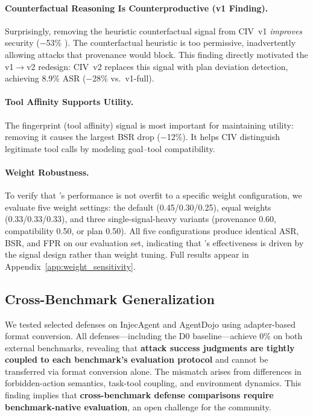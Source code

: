 \paragraph{Counterfactual Reasoning Is Counterproductive (v1 Finding).}
Surprisingly, removing the heuristic counterfactual signal from CIV~v1 \emph{improves} security ($-$53\% \asr{}).
The counterfactual heuristic is too permissive, inadvertently allowing attacks that provenance would block.
This finding directly motivated the v1$\to$v2 redesign: CIV~v2 replaces this signal with plan deviation detection, achieving 8.9\% ASR ($-$28\% vs.\ v1-full).

\paragraph{Tool Affinity Supports Utility.}
The fingerprint (tool affinity) signal is most important for maintaining utility: removing it causes the largest BSR drop ($-$12\%).
It helps CIV distinguish legitimate tool calls by modeling goal--tool compatibility.

\paragraph{Weight Robustness.}
To verify that \civ{}'s performance is not overfit to a specific weight configuration, we evaluate five weight settings: the default (0.45/0.30/0.25), equal weights (0.33/0.33/0.33), and three single-signal-heavy variants (provenance 0.60, compatibility 0.50, or plan 0.50).
All five configurations produce identical ASR, BSR, and FPR on our evaluation set, indicating that \civ{}'s effectiveness is driven by the signal design rather than weight tuning.
Full results appear in Appendix~\ref{app:weight_sensitivity}.

\subsection{Cross-Benchmark Generalization}
\label{sec:cross_benchmark}

We tested selected defenses on InjecAgent \citep{zhan2024injecagent} and AgentDojo \citep{debenedetti2024agentdojo} using adapter-based format conversion.
All defenses---including the D0 baseline---achieve 0\% \asr{} on both external benchmarks, revealing that \textbf{attack success judgments are tightly coupled to each benchmark's evaluation protocol} and cannot be transferred via format conversion alone.
The mismatch arises from differences in forbidden-action semantics, task-tool coupling, and environment dynamics.
This finding implies that \textbf{cross-benchmark defense comparisons require benchmark-native evaluation}, an open challenge for the community.
